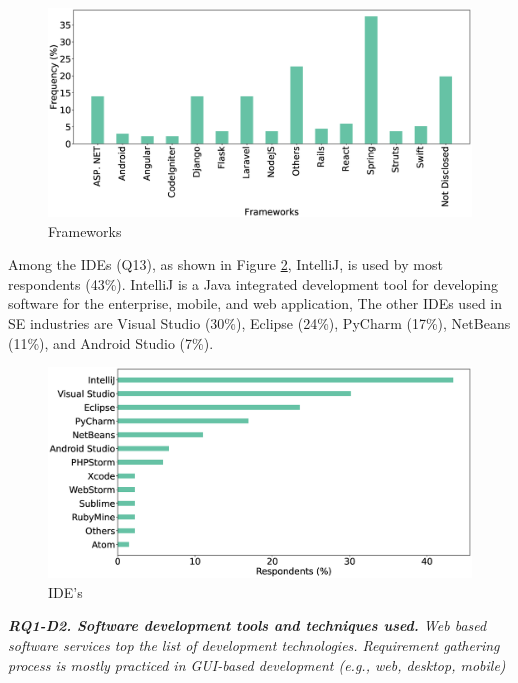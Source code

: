 \begin{figure}[t]
\centering
  \includegraphics[scale=0.18]{Figures/Respondents_frameworks}
  \caption{Frameworks}
  \label{fig:frameworks}
\end{figure}

Among the IDEs (Q13), as shown in Figure \ref{fig:IDEs},
IntelliJ, is used by most respondents (43\%). IntelliJ is a Java integrated development tool for developing software for the
enterprise, mobile, and web application, The
other IDEs used in SE industries are Visual Studio (30\%), Eclipse (24\%),
PyCharm (17\%), NetBeans (11\%), and Android Studio (7\%).

\begin{figure}[t]
\centering
  \includegraphics[scale=0.18]{Figures/Respondents_IDEs}
  \caption{IDE's}
  \label{fig:IDEs}
\end{figure}
\begin{tcolorbox}[flushleft upper,boxrule=1pt,arc=0pt,left=0pt,right=0pt,top=0pt,bottom=0pt,colback=white,after=\ignorespacesafterend\par\noindent]
\nd\it{\bf{RQ1-D2. Software development tools and techniques used.}} Web based software services top the list of development technologies. Requirement gathering process is mostly practiced in GUI-based development
(e.g., web, desktop, mobile) 
\end{tcolorbox}
